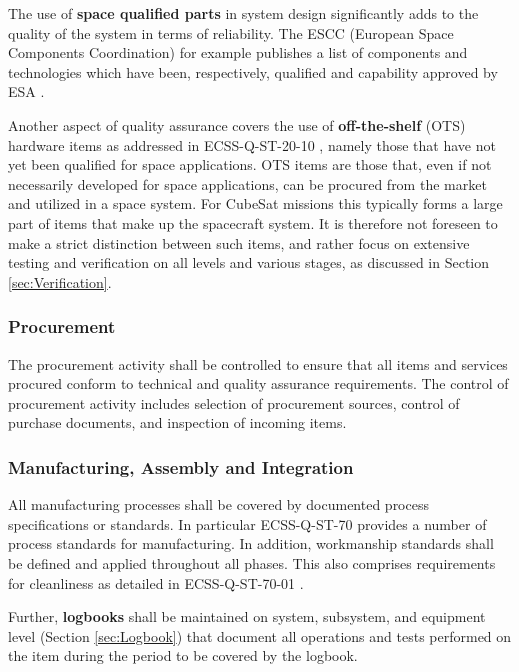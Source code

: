 The use of \textbf{space qualified parts} in system design significantly adds to the quality of the system in terms of reliability. The ESCC (European Space Components Coordination) for example publishes a list of components and technologies which have been, respectively, qualified and capability approved by ESA \cite{spacecomponents.org}.

Another aspect of quality assurance covers the use of \textbf{off-the-shelf} (OTS) hardware items as addressed in ECSS-Q-ST-20-10 \cite{ECSS-Q-ST-20-10}, namely those that have not yet been qualified for space applications. OTS items are those that, even if not necessarily developed for space applications, can be procured from the market and utilized in a space system. For CubeSat missions this typically forms a large part of items that make up the spacecraft system. It is therefore not foreseen to make a strict distinction between such items, and rather focus on extensive testing and verification on all levels and various stages, as discussed in Section \ref{sec:Verification}.

\subsubsection{Procurement}

The procurement activity shall be controlled to ensure that all items and services
procured conform to technical and quality assurance requirements. The control of procurement activity includes selection of procurement sources, control of purchase documents, and inspection of incoming items.

\subsubsection{Manufacturing, Assembly and Integration}

All manufacturing processes shall be covered by documented process specifications or standards. In particular ECSS-Q-ST-70 \cite{ECSS-Q-ST-70} provides a number of process standards for manufacturing. In addition, workmanship standards shall be defined and applied throughout all phases. This also comprises requirements for cleanliness as detailed in ECSS-Q-ST-70-01 \cite{ECSS-Q-ST-70-01}.

Further, \textbf{logbooks} shall be maintained on system, subsystem, and equipment level (Section \ref{sec:Logbook}) that document all operations and tests performed on the item during the period to be covered by the logbook.

